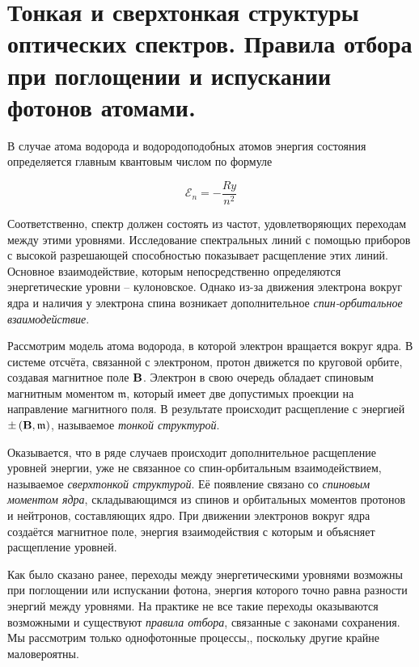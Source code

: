 \section{Тонкая и сверхтонкая структуры оптических спектров. Правила отбора при поглощении и испускании фотонов атомами.}

В случае атома водорода и водородоподобных атомов энергия состояния определяется главным квантовым числом по формуле

\begin{equation}
    \mathcal{E}_n = - \frac{Ry}{n^2}
\end{equation}

\noindent
Соответственно, спектр должен состоять из частот, удовлетворяющих переходам между этими уровнями. Исследование спектральных линий с помощью приборов с высокой разрешающей способностью показывает расщепление этих линий. Основное взаимодействие, которым непосредственно определяются энергетические уровни -- кулоновское. Однако из-за движения электрона вокруг ядра и наличия у электрона спина возникает дополнительное \textit{спин-орбитальное взаимодействие}.

Рассмотрим модель атома водорода, в которой электрон вращается вокруг ядра. В системе отсчёта, связанной с электроном, протон движется по круговой орбите, создавая магнитное поле $\mathbf B$. Электрон в свою очередь обладает спиновым магнитным моментом $\mathfrak{m}$, который имеет две допустимых проекции на направление магнитного поля. В результате происходит расщепление с энергией $\pm \left( \mathbf B, \mathfrak{m} \right)$, называемое \textit{тонкой структурой}.

Оказывается, что в ряде случаев происходит дополнительное расщепление уровней энергии, уже не связанное со спин-орбитальным взаимодействием, называемое \textit{сверхтонкой структурой}. Её появление связано со \textit{спиновым моментом ядра}, складывающимся из спинов и орбитальных моментов протонов и нейтронов, составляющих ядро. При движении электронов вокруг ядра создаётся магнитное поле, энергия взаимодействия с которым и объясняет расщепление уровней.

Как было сказано ранее, переходы между энергетическими уровнями возможны при поглощении или испускании фотона, энергия которого точно равна разности энергий между уровнями. На практике не все такие переходы оказываются возможными и существуют \textit{правила отбора}, связанные с законами сохранения. Мы рассмотрим только однофотонные процессы,, поскольку другие крайне маловероятны.

